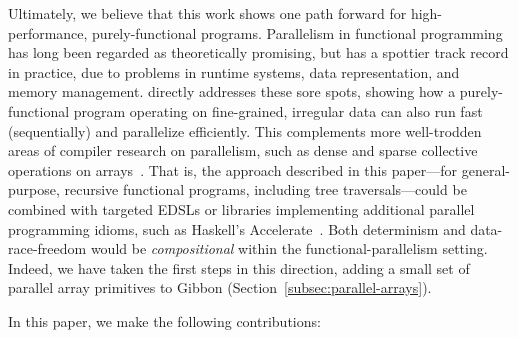 \documentclass[acmsmall,acmthm=false,nonacm]{acmart}
\theoremstyle{straighttext0}
\theoremstyle{straighttext}
\newcommand{\Secref}[1]{Section~\ref{#1}}
\begin{document}
Ultimately, we believe that this work shows one path forward for
high-performance, purely-functional programs.  Parallelism in functional
programming has long been regarded as theoretically promising, but has a
spottier track record in practice, due to problems in runtime systems, data
representation, and memory management.
\pargibbon{} directly addresses these sore spots, showing how a
purely-functional program operating on fine-grained, irregular data can also run
fast (sequentially) and parallelize efficiently.
%
This complements more well-trodden areas of compiler research on parallelism, such
as dense and sparse collective operations on arrays~\cite{julia-parallel-accelerator, tensorflow, pytorch, nesl}.
%
That is, the approach described in this paper---for general-purpose, recursive
functional programs, including tree traversals---could be combined with targeted EDSLs or libraries implementing additional parallel programming idioms,
such as Haskell's Accelerate~\cite{accelerate}.  Both determinism and
data-race-freedom would be {\em compositional} within the functional-parallelism
setting.
%
Indeed, we have taken the first steps in this direction, adding a small set of parallel array primitives to Gibbon (\Secref{subsec:parallel-arrays}).

In this paper, we make the following contributions:
\end{document}
